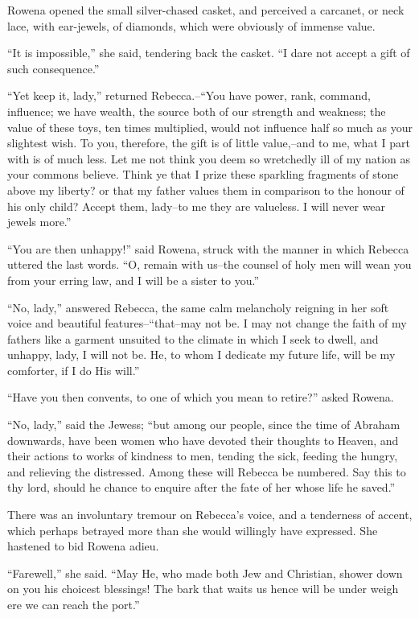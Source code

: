 Rowena opened the small silver-chased casket, and perceived a carcanet,
or neck lace, with ear-jewels, of diamonds, which were obviously of
immense value.

``It is impossible,'' she said, tendering back the casket. ``I dare not
accept a gift of such consequence.''

``Yet keep it, lady,'' returned Rebecca.--``You have power, rank,
command, influence; we have wealth, the source both of our strength and
weakness; the value of these toys, ten times multiplied, would not
influence half so much as your slightest wish. To you, therefore, the
gift is of little value,--and to me, what I part with is of much less.
Let me not think you deem so wretchedly ill of my nation as your commons
believe. Think ye that I prize these sparkling fragments of stone above
my liberty? or that my father values them in comparison to the honour of
his only child? Accept them, lady--to me they are valueless. I will
never wear jewels more.''

``You are then unhappy!'' said Rowena, struck with the manner in which
Rebecca uttered the last words. ``O, remain with us--the counsel of holy
men will wean you from your erring law, and I will be a sister to you.''

``No, lady,'' answered Rebecca, the same calm melancholy reigning in her
soft voice and beautiful features--``that--may not be. I may not change
the faith of my fathers like a garment unsuited to the climate in which
I seek to dwell, and unhappy, lady, I will not be. He, to whom I
dedicate my future life, will be my comforter, if I do His will.''

``Have you then convents, to one of which you mean to retire?'' asked
Rowena.

``No, lady,'' said the Jewess; ``but among our people, since the time of
Abraham downwards, have been women who have devoted their thoughts to
Heaven, and their actions to works of kindness to men, tending the sick,
feeding the hungry, and relieving the distressed. Among these will
Rebecca be numbered. Say this to thy lord, should he chance to enquire
after the fate of her whose life he saved.''

There was an involuntary tremour on Rebecca's voice, and a tenderness of
accent, which perhaps betrayed more than she would willingly have
expressed. She hastened to bid Rowena adieu.

``Farewell,'' she said. ``May He, who made both Jew and Christian,
shower down on you his choicest blessings! The bark that waits us hence
will be under weigh ere we can reach the port.''

